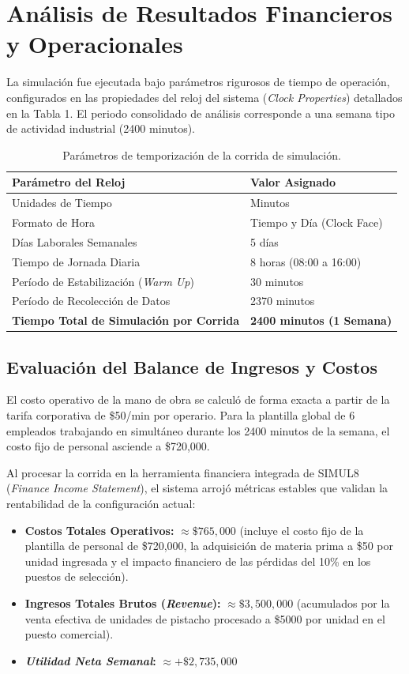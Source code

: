 \documentclass{llncs}
\begin{document}
\section{Análisis de Resultados Financieros y Operacionales}
La simulación fue ejecutada bajo parámetros rigurosos de tiempo de operación, configurados en las propiedades del reloj del sistema (\textit{Clock Properties}) detallados en la Tabla 1. El periodo consolidado de análisis corresponde a una semana tipo de actividad industrial (2400 minutos).

\begin{table}[htbp]
\centering
\caption{Parámetros de temporización de la corrida de simulación.}
\begin{tabular}{ll}
\toprule
\textbf{Parámetro del Reloj} & \textbf{Valor Asignado} \\ \midrule
Unidades de Tiempo & Minutos \\
Formato de Hora & Tiempo y Día (Clock Face) \\
Días Laborales Semanales & 5 días \\
Tiempo de Jornada Diaria & 8 horas (08:00 a 16:00) \\
Período de Estabilización (\textit{Warm Up}) & 30 minutos \\
Período de Recolección de Datos & 2370 minutos \\
\textbf{Tiempo Total de Simulación por Corrida} & \textbf{2400 minutos (1 Semana)} \\ \bottomrule
\end{tabular}
\end{table}

\subsection{Evaluación del Balance de Ingresos y Costos}
El costo operativo de la mano de obra se calculó de forma exacta a partir de la tarifa corporativa de \$50/min por operario. Para la plantilla global de 6 empleados trabajando en simultáneo durante los 2400 minutos de la semana, el costo fijo de personal asciende a \$720,000. 

Al procesar la corrida en la herramienta financiera integrada de SIMUL8 (\textit{Finance Income Statement}), el sistema arrojó métricas estables que validan la rentabilidad de la configuración actual:
\begin{itemize}
    \item \textbf{Costos Totales Operativos:} $\approx \$765,000$ (incluye el costo fijo de la plantilla de personal de \$720,000, la adquisición de materia prima a \$50 por unidad ingresada y el impacto financiero de las pérdidas del 10\% en los puestos de selección).
    \item \textbf{Ingresos Totales Brutos (\textit{Revenue}):} $\approx \$3,500,000$ (acumulados por la venta efectiva de unidades de pistacho procesado a \$5000 por unidad en el puesto comercial).
    \item \textbf{\textit{Utilidad Neta Semanal}:} $\approx +\$2,735,000$
\end{itemize}
\end{document}

